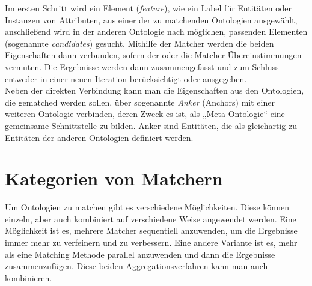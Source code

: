 	Im ersten Schritt wird ein Element (\textit{feature}), wie ein Label für
	Entitäten oder Instanzen von Attributen, aus einer der zu matchenden Ontologien ausgewählt,
	anschließend wird in der anderen Ontologie nach möglichen, passenden
	Elementen (sogenannte \textit{candidates}) gesucht. Mithilfe der Matcher werden
	die beiden Eigenschaften dann verbunden, sofern der oder die Matcher
	Übereinstimmungen vermuten. Die Ergebnisse werden dann zusammengefasst und zum
	Schluss entweder in einer neuen Iteration berücksichtigt oder ausgegeben. \cite{Hoo14}\\
	Neben der direkten Verbindung kann man die Eigenschaften aus den Ontologien, die
	gematched werden sollen, über sogenannte \textit{Anker} (Anchors) mit einer
	weiteren Ontologie verbinden, deren Zweck es ist, als „Meta-Ontologie“ eine
	gemeinsame Schnittstelle zu bilden. Anker sind Entitäten, die als gleichartig
	zu Entitäten der anderen Ontologien definiert werden.\cite{Hoo14}
	
	\section{Kategorien von Matchern}
	\label{MatcherKategorien}
	Um Ontologien zu matchen gibt es verschiedene Möglichkeiten. Diese können einzeln, aber auch kombiniert auf verschiedene Weise angewendet werden. Eine Möglichkeit ist es, mehrere Matcher sequentiell anzuwenden, um die Ergebnisse immer mehr zu verfeinern und zu verbessern. Eine andere Variante ist es, mehr als eine Matching Methode parallel anzuwenden und dann die Ergebnisse zusammenzufügen. Diese beiden Aggregationsverfahren kann man auch kombinieren. \cite{Hoo14}
	

